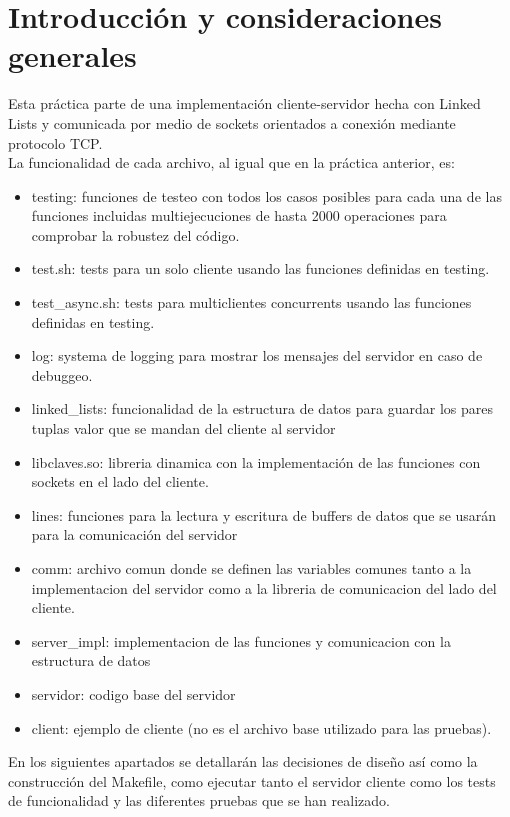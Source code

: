 \section{Introducción y consideraciones generales}

Esta práctica parte de una implementación cliente-servidor hecha con Linked Lists y comunicada por medio de sockets orientados a conexión mediante protocolo TCP.\\

La funcionalidad de cada archivo, al igual que en la práctica anterior, es:
\begin{itemize}
    \item testing: funciones de testeo con todos los casos posibles para cada una de las funciones incluidas multiejecuciones de hasta 2000 operaciones para comprobar la robustez del código.
    \item test.sh: tests para un solo cliente usando las funciones definidas en testing.
    \item test\_async.sh: tests para multiclientes concurrents usando las funciones definidas en testing. 
    \item log: systema de logging para mostrar los mensajes del servidor en caso de debuggeo.
    \item linked\_lists: funcionalidad de la estructura de datos para guardar los pares tuplas valor que se mandan del cliente al servidor
    \item libclaves.so: libreria dinamica con la implementación de las funciones con sockets en el lado del cliente.
    \item lines: funciones para la lectura y escritura de buffers de datos que se usarán para la comunicación del servidor
    \item comm: archivo comun donde se definen las variables comunes tanto a la implementacion del servidor como a la libreria de comunicacion del lado del cliente.
    \item server\_impl: implementacion de las funciones y comunicacion con la estructura de datos
    \item servidor: codigo base del servidor
    \item client: ejemplo de cliente (no es el archivo base utilizado para las pruebas).
\end{itemize}


En los siguientes apartados se detallarán las decisiones de diseño así como la construcción del Makefile, como ejecutar tanto el servidor cliente como los tests de funcionalidad y las diferentes pruebas que se han realizado.